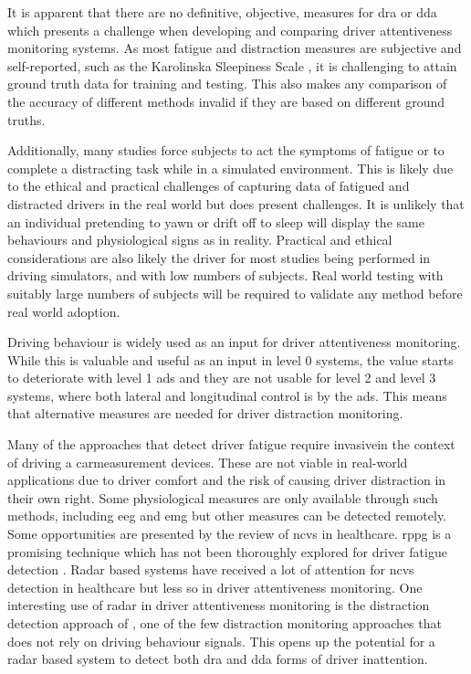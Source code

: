 \documentclass[11pt, parskip=half*,twoside=false]{scrbook}
\begin{document}
{It is apparent that there are no definitive, objective, measures for \gls{dra} or \gls{dda} which presents a challenge when developing and comparing driver attentiveness monitoring systems. As most fatigue and distraction measures are subjective and self-reported, such as the Karolinska Sleepiness Scale \citep{kaidaValidationKarolinskaSleepiness2006}, it is challenging to attain ground truth data for training and testing. This also makes any comparison of the accuracy of different methods invalid if they are based on different ground truths. 

Additionally, many studies force subjects to act the symptoms of fatigue or to complete a distracting task while in a simulated environment. This is likely due to the ethical and practical challenges of capturing data of fatigued and distracted drivers in the real world but does present challenges. It is unlikely that an individual pretending to yawn or drift off to sleep will display the same behaviours and physiological signs as in reality. Practical and ethical considerations are also likely the driver for most studies being performed in driving simulators, and with low numbers of subjects. Real world testing with suitably large numbers of subjects will be required to validate any method before real world adoption.

Driving behaviour is widely used as an input for driver attentiveness monitoring. While this is valuable and useful as an input in level 0 systems, the value starts to deteriorate with level 1 \gls{ads} and they are not usable for level 2 and level 3 systems, where both lateral and longitudinal control is by the \gls{ads}. This means that alternative measures are needed for driver distraction monitoring. 

Many of the approaches that detect driver fatigue require invasive\textemdash in the context of driving a car\textemdash measurement devices. These are not viable in real-world applications due to driver comfort and the risk of causing driver distraction in their own right. Some physiological measures are only available through such methods, including \gls{eeg} and \gls{emg} but other measures can be detected remotely. Some opportunities are presented by the review of \gls{ncvs} in healthcare. \Gls{rppg} is a promising technique which has not been thoroughly explored for driver fatigue detection \citep{sikanderDriverFatigueDetection2019}. Radar based systems have received a lot of attention for \gls{ncvs} detection in healthcare \citep{sikanderDriverFatigueDetection2019} but less so in driver attentiveness monitoring. One interesting use of radar in driver attentiveness monitoring is the distraction detection approach of \citet{dingInattentiveDrivingBehavior2019}, one of the few distraction monitoring approaches that does not rely on driving behaviour signals. This opens up the potential for a radar based system to detect both \gls{dra} and \gls{dda} forms of driver inattention.


}
\end{document}
